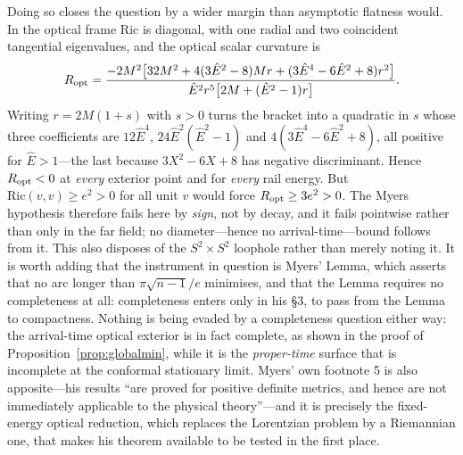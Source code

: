 \documentclass[12pt]{iopart}
\theoremstyle{plain}
\theoremstyle{definition}
\theoremstyle{remark}
\newcommand{\Ehat}{\hat E}
\begin{document}
Doing so closes the question by a wider margin than asymptotic flatness would. In
the optical frame $\mathrm{Ric}$ is diagonal, with one radial and two coincident
tangential eigenvalues, and the optical scalar curvature is
\begin{equation}
    R_{\rm opt}=\frac{-2M^2\big[32M^2+4(3\Ehat^2-8)Mr+(3\Ehat^4-6\Ehat^2+8)r^2\big]}
      {\Ehat^2r^5\big[2M+(\Ehat^2-1)r\big]} .
    \label{eq:optical-scalar}
\end{equation}
Writing $r=2M(1+s)$ with $s>0$ turns the bracket into a quadratic in $s$ whose three
coefficients are $12\Ehat^4$, $24\Ehat^2(\Ehat^2-1)$ and $4(3\Ehat^4-6\Ehat^2+8)$,
all positive for $\Ehat>1$---the last because $3X^2-6X+8$ has negative discriminant.
Hence $R_{\rm opt}<0$ at \emph{every} exterior point and for \emph{every} rail
energy. But $\mathrm{Ric}(v,v)\ge e^2>0$ for all unit $v$ would force
$R_{\rm opt}\ge3e^2>0$. The Myers hypothesis therefore fails here by \emph{sign},
not by decay, and it fails pointwise rather than only in the far field; no
diameter---hence no arrival-time---bound follows from it. This also disposes of the
$S^2\times S^2$ loophole rather than merely noting it. It is worth adding that the
instrument in question is Myers' Lemma, which asserts that no arc longer than
$\pi\sqrt{n-1}/e$ minimises, and that the Lemma requires no completeness at all:
completeness enters only in his \S3, to pass from the Lemma to compactness. Nothing
is being evaded by a completeness question either way: the arrival-time optical
exterior is in fact complete, as shown in the proof of Proposition~\ref{prop:globalmin}, while it is the
\emph{proper-time} surface that is incomplete at the conformal stationary limit. Myers' own footnote 5
is also apposite---his results ``are proved for positive definite metrics, and hence
are not immediately applicable to the physical theory''---and it is precisely the
fixed-energy optical reduction, which replaces the Lorentzian problem by a
Riemannian one, that makes his theorem available to be tested in the first place.
\end{document}
